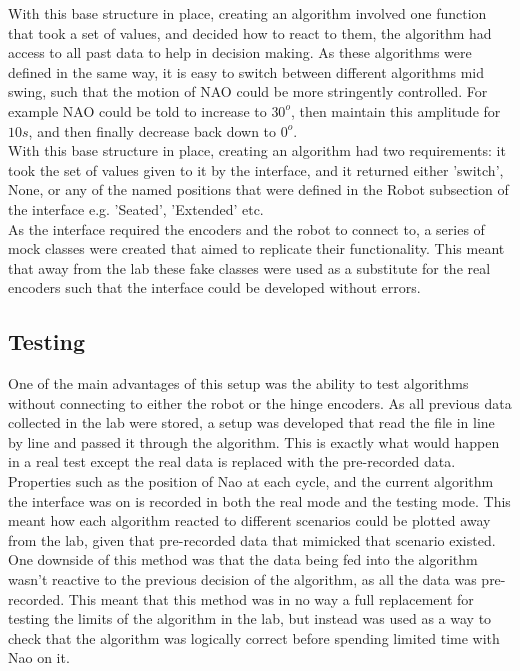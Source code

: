 \documentclass[11pt]{article}
\begin{document}
With this base structure in place, creating an algorithm involved one function that took a set of values, and decided how to react to them, the algorithm had access to all past data to help in decision making. As these algorithms were defined in the same way, it is easy to switch between different algorithms mid swing, such that the motion of NAO could be more stringently controlled. For example NAO could be told to increase to $30^o$, then maintain this amplitude for $10s$, and then finally decrease back down to $0^o$.\\

With this base structure in place, creating an algorithm had two requirements: it took the set of values given to it by the interface, and it returned either 'switch', None, or any of the named positions that were defined in the Robot subsection of the interface e.g. 'Seated', 'Extended' etc.\\

As the interface required the encoders and the robot to connect to, a series of mock classes were created that aimed to replicate their functionality. This meant that away from the lab these fake classes were used as a substitute for the real encoders such that the interface could be developed without errors.

\subsection{Testing}
One of the main advantages of this setup was the ability to test algorithms without connecting to either the robot or the hinge encoders. As all previous data collected in the lab were stored, a setup was developed that read the file in line by line and passed it through the algorithm. This is exactly what would happen in a real test except the real data is replaced with the pre-recorded data.\\
Properties such as the position of Nao at each cycle, and the current algorithm the interface was on is recorded in both the real mode and the testing mode. This meant how each algorithm reacted to different scenarios could be plotted away from the lab, given that pre-recorded data that mimicked that scenario existed.\\
One downside of this method was that the data being fed into the algorithm wasn't reactive to the previous decision of the algorithm, as all the data was pre-recorded. This meant that this method was in no way a full replacement for testing the limits of the algorithm in the lab, but instead was used as a way to check that the algorithm was logically correct before spending limited time with Nao on it.
\end{document}
